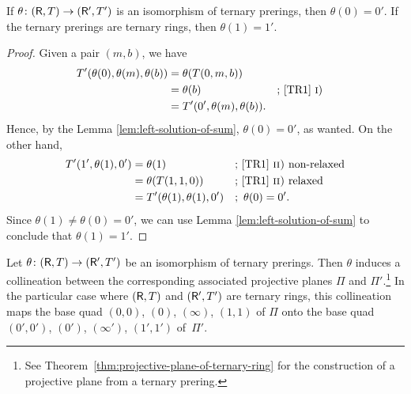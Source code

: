 \begin{lem}\label{lem:ternary-isomorphisms-preserve-units}
    If\/ $\theta\colon(\mathsf R,T)\to(\mathsf R',T')$ is an isomorphism of ternary prerings, then\/ $\theta(0)=0'$. If the ternary prerings are ternary rings, then\/ $\theta(1)=1'$.
\end{lem}

\begin{proof}
    Given a pair $(m,b)$, we have
    \begin{align*}
        T'(\theta(0),\theta(m),\theta(b)) &= \theta(T(0,m,b))\\
            &=\theta(b) 
                &&\text{; \ref{TR1} \textsc i)}\\
            &= T'(0',\theta(m),\theta(b)).
    \end{align*}
    Hence, by the Lemma \ref{lem:left-solution-of-sum}, $\theta(0)=0'$, as wanted. On the other hand,
    \begin{align*}
        T'(1',\theta(1),0') &= \theta(1)
                &&\text{; \ref{TR1} \textsc{ii)} non-relaxed}\\
            &= \theta(T(1,1,0))
                &&\text{; \ref{TR1} \textsc{ii)} relaxed}\\
            &= T'(\theta(1),\theta(1),0')
                &&;\ \theta(0)=0'.
    \end{align*}
    Since $\theta(1)\ne\theta(0)=0'$, we can use Lemma \ref{lem:left-solution-of-sum} to conclude that $\theta(1)=1'$.
\end{proof}

\begin{prop}\label{prop:coorinatized-isomorphism}
    Let\/ $\theta\colon (\mathsf R,T)\to(\mathsf R',T')$ be an isomorphism of ternary prerings. Then\/ $\theta$ induces a collineation between the corresponding associated projective planes\/ $\Pi$ and\/ $\Pi'$.\footnote{See {\upshape Theorem~\ref{thm:projective-plane-of-ternary-ring}} for the construction of a projective plane from a ternary prering.} In the particular case where\/ $(\mathsf R,T)$ and\/ $(\mathsf R',T')$ are ternary rings, this collineation maps the base quad\/ $(0,0)$, $(0)$, $(\infty)$, $(1,1)$ of\/ $\Pi$ onto the base quad\/ $(0',0')$, $(0')$, $(\infty')$, $(1',1')$ of\/~$\Pi'$.
\end{prop}



